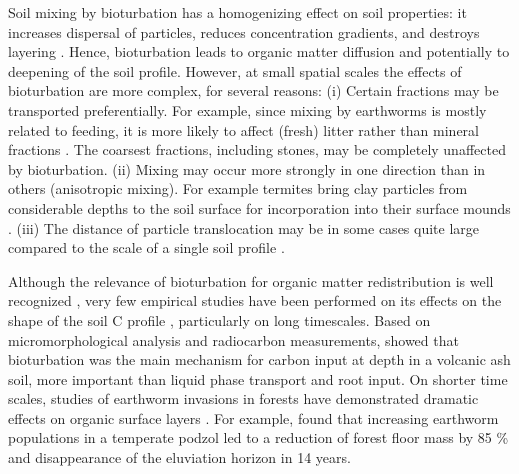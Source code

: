 \documentclass[11pt, oneside, a4paper]{article}   	%
\begin{document}
Soil mixing by bioturbation has a homogenizing effect on soil properties: it increases
dispersal of particles, reduces concentration gradients, and destroys layering \citep{Johnson1987}. Hence, bioturbation leads to organic matter diffusion and potentially to deepening of the soil profile. However, at small spatial scales the effects of bioturbation are
more complex, for several reasons: (i) Certain fractions may be transported preferentially. For example, since mixing by earthworms is mostly related to feeding, it is
more likely to affect (fresh) litter rather  than mineral fractions \citep{Johnson2005}. The
coarsest fractions, including stones, may be completely unaffected by bioturbation.
(ii) Mixing may occur more strongly in one direction than in others (anisotropic mixing). For example termites bring clay particles from considerable depths to the soil
surface for incorporation into their surface mounds \citep{Paton1995}. (iii) The
distance of particle translocation may be in some cases quite large compared to the scale of a single
soil profile \citep{Boudreau1986b}.

Although the relevance of bioturbation for organic matter redistribution is well
recognized \citep{vanBreemen1997, Chapin2002, Hoosbeek2009}, very few empirical studies have been performed on its effects on
the shape of the soil C profile \citep{Tonneijck2008, Yoo2011}, particularly on
long timescales. Based on micromorphological analysis and radiocarbon measurements,
\citet{Tonneijck2008} showed that bioturbation was the main mechanism
for carbon input at depth in a volcanic ash soil, more important than liquid phase
transport and root input. On shorter time scales, studies of earthworm invasions
in forests have demonstrated dramatic effects on organic surface layers \citep{Alban1994, Bohlen2004}. For example, \citet{Alban1994} found that
increasing earthworm populations in a temperate podzol led to a reduction of forest
floor mass by 85 \% and disappearance of the eluviation horizon in 14 years.
\end{document}
